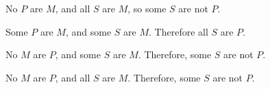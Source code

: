  
\begin{exercises} 
 
\item No $P$ are $M$, and all $S$ are $M$, so some $S$ are not $P$.
 
\item Some $P$ are $M$, and some $S$ are $M$. Therefore all $S$ are $P$.

\item No $M$ are $P$, and some $S$ are $M$. Therefore, some $S$ are not $P$.

\item  No $M$ are $P$, and all $S$ are $M$. Therefore, some $S$ are not $P$.
\end{exercises}

